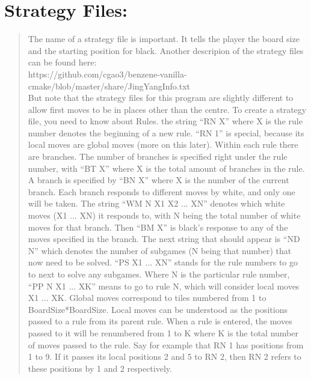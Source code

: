 \documentclass{article}
\begin{document}
\section{Strategy Files:}
\label{Strategy Files}
\begin{quote}
  The name of a strategy file is important. It tells the player the board size and the starting position for black. Another descripion of the strategy files can be found here:\\ https://github.com/cgao3/benzene-vanilla-cmake/blob/master/share/JingYangInfo.txt\\ But note that the strategy files for this program are slightly different to allow first moves to be in places other than the centre. To create a strategy file, you need to know about Rules. the string ``RN X'' where X is the rule number denotes the beginning of a new rule. ``RN 1'' is special, because its local moves are global moves (more on this later). Within each rule there are branches. The number of branches is specified right under the rule number, with ``BT X'' where X is the total amount of branches in the rule. A branch is specified by ``BN X'' where X is the number of the current branch. Each branch responds to different moves by white, and only one will be taken. The string ``WM N X1 X2 ... XN'' denotes which white moves (X1 ... XN) it responds to, with N being the total number of white moves for that branch. Then ``BM X'' is black's response to any of the moves specified in the branch. The next string that should appear is ``ND N'' which denotes the number of subgames (N being that number) that now need to be solved. ``PS X1 ... XN'' stands for the rule numbers to go to next to solve any subgames. Where N is the particular rule number, ``PP N X1 ... XK'' means to go to rule N, which will consider local moves X1 ... XK. Global moves correspond to tiles numbered from 1 to BoardSize*BoardSize. Local moves can be understood as the positions passed to a rule from its parent rule. When a rule is entered, the moves passed to it will be renumbered from 1 to K where K is the total number of moves passed to the rule. Say for example that RN 1 has positions from 1 to 9. If it passes its local positions 2 and 5 to RN 2, then RN 2 refers to these positions by 1 and 2 respectively.
\end{quote}
\end{document}
